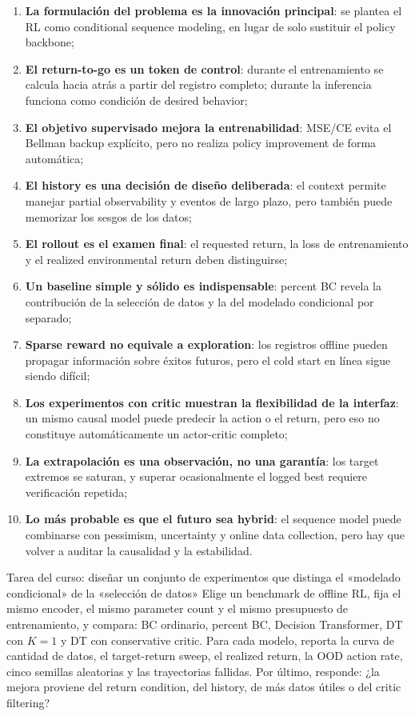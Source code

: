 \documentclass[a4paper]{article}
\begin{document}
\begin{enumerate}
  \item \textbf{La formulación del problema es la innovación principal}: se plantea el RL como conditional sequence modeling, en lugar de solo sustituir el policy backbone;
  \item \textbf{El return-to-go es un token de control}: durante el entrenamiento se calcula hacia atrás a partir del registro completo; durante la inferencia funciona como condición de desired behavior;
  \item \textbf{El objetivo supervisado mejora la entrenabilidad}: MSE/CE evita el Bellman backup explícito, pero no realiza policy improvement de forma automática;
  \item \textbf{El history es una decisión de diseño deliberada}: el context permite manejar partial observability y eventos de largo plazo, pero también puede memorizar los sesgos de los datos;
  \item \textbf{El rollout es el examen final}: el requested return, la loss de entrenamiento y el realized environmental return deben distinguirse;
  \item \textbf{Un baseline simple y sólido es indispensable}: percent BC revela la contribución de la selección de datos y la del modelado condicional por separado;
  \item \textbf{Sparse reward no equivale a exploration}: los registros offline pueden propagar información sobre éxitos futuros, pero el cold start en línea sigue siendo difícil;
  \item \textbf{Los experimentos con critic muestran la flexibilidad de la interfaz}: un mismo causal model puede predecir la action o el return, pero eso no constituye automáticamente un actor-critic completo;
  \item \textbf{La extrapolación es una observación, no una garantía}: los target extremos se saturan, y superar ocasionalmente el logged best requiere verificación repetida;
  \item \textbf{Lo más probable es que el futuro sea hybrid}: el sequence model puede combinarse con pessimism, uncertainty y online data collection, pero hay que volver a auditar la causalidad y la estabilidad.
\end{enumerate}

\begin{importantbox}{Tarea del curso: diseñar un conjunto de experimentos que distinga el «modelado condicional» de la «selección de datos»}
Elige un benchmark de offline RL, fija el mismo encoder, el mismo parameter count y el mismo presupuesto de entrenamiento, y compara: BC ordinario, percent BC, Decision Transformer, DT con $K=1$ y DT con conservative critic. Para cada modelo, reporta la curva de cantidad de datos, el target-return sweep, el realized return, la OOD action rate, cinco semillas aleatorias y las trayectorias fallidas. Por último, responde: ¿la mejora proviene del return condition, del history, de más datos útiles o del critic filtering?
\end{importantbox}
\end{document}
